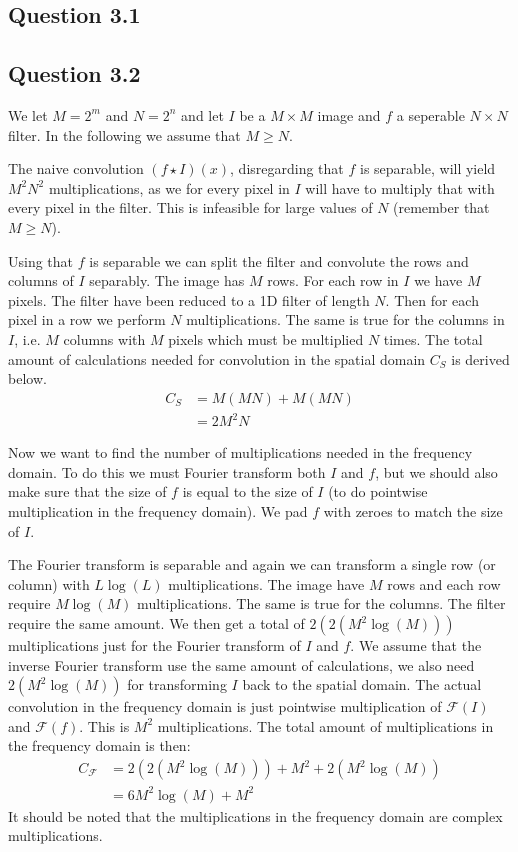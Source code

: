\documentclass[a4paper, 10pt, final]{article}
\title{\mytitle}
\subtitle{\mysubtitle}
\author{\myauthor{} - \mymail}
\date{\mydate}
\begin{document}
\maketitle

\subsection*{Question 3.1}

\subsection*{Question 3.2}
We let $M = 2^m$ and $N = 2^n$ and let $I$ be a $M \times M$ image and
$f$ a seperable $N \times N$ filter. In the following we assume that
$M \geq N$.

The naive convolution $(f \star I)(x)$, disregarding that $f$ is separable,
will yield $M^2N^2$ multiplications, as we for every pixel in $I$ will
have to multiply that with every pixel in the filter. This is infeasible
for large values of $N$ (remember that $M \geq N$).

Using that $f$ is separable we can split the filter and convolute the
rows and columns of $I$ separably. The image has $M$ rows. For each row
in $I$ we have $M$ pixels. The filter have been reduced to a 1D filter
of length $N$. Then for each pixel in a row we perform $N$
multiplications. The same is true for the columns in $I$, i.e.  $M$
columns with $M$ pixels which must be multiplied $N$ times. The total
amount of calculations needed for convolution in the spatial domain
$C_S$ is derived below.
\begin{align}
    C_S & = M(MN) + M(MN)\\
    & = 2M^2N
\end{align}

Now we want to find the number of multiplications needed in the
frequency domain. To do this we must Fourier transform both $I$ and
$f$, but we should also make sure that the size of $f$ is equal to the
size of $I$ (to do pointwise multiplication in the frequency domain). We
pad $f$ with zeroes to match the size of $I$.

The Fourier transform is separable and again we can transform a single
row (or column) with $L\log(L)$ multiplications. The image have $M$ rows
and each row require $M\log(M)$ multiplications. The same is true for
the columns. The filter require the same amount. We then get a total of
$2(2(M^2\log(M)))$ multiplications just for the Fourier transform of $I$
and $f$. We assume that the inverse Fourier transform use the same
amount of calculations, we also need $2(M^2\log(M))$ for transforming
$I$ back to the spatial domain. The actual convolution in the frequency
domain is just pointwise multiplication of $\mathcal{F}(I)$ and
$\mathcal{F}(f)$. This is $M^2$ multiplications. The total amount of
multiplications in the frequency domain is then:
\begin{align}
    C_{\mathcal{F}} & = 2(2(M^2\log(M))) + M^2 + 2(M^2\log(M))\\
    & = 6M^2\log(M) + M^2
\end{align}
It should be noted that the multiplications in the frequency domain are
complex multiplications.
\end{document}
